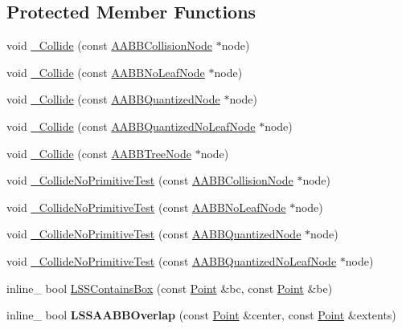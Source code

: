 \subsection*{Protected Member Functions}
\begin{DoxyCompactItemize}
\item 
void \hyperlink{classOpcode_1_1LSSCollider_a74b9eb6e39c8b4859acf2d3ca081c0d4}{\+\_\+\+Collide} (const \hyperlink{classOpcode_1_1AABBCollisionNode}{A\+A\+B\+B\+Collision\+Node} $\ast$node)
\item 
void \hyperlink{classOpcode_1_1LSSCollider_a9792bff52aa3bf2649985effc4d9ad70}{\+\_\+\+Collide} (const \hyperlink{classOpcode_1_1AABBNoLeafNode}{A\+A\+B\+B\+No\+Leaf\+Node} $\ast$node)
\item 
void \hyperlink{classOpcode_1_1LSSCollider_ad825f62a1d2526c2e99a2af5914fa0a8}{\+\_\+\+Collide} (const \hyperlink{classOpcode_1_1AABBQuantizedNode}{A\+A\+B\+B\+Quantized\+Node} $\ast$node)
\item 
void \hyperlink{classOpcode_1_1LSSCollider_abf5c28e72380d3c823f3dbbb235bd14d}{\+\_\+\+Collide} (const \hyperlink{classOpcode_1_1AABBQuantizedNoLeafNode}{A\+A\+B\+B\+Quantized\+No\+Leaf\+Node} $\ast$node)
\item 
void \hyperlink{classOpcode_1_1LSSCollider_a9f2c81b73391ff1cc32c0ee4c4bc7aca}{\+\_\+\+Collide} (const \hyperlink{classOpcode_1_1AABBTreeNode}{A\+A\+B\+B\+Tree\+Node} $\ast$node)
\item 
void \hyperlink{classOpcode_1_1LSSCollider_a1bf5401f4728c864a6b147d72b29dcc7}{\+\_\+\+Collide\+No\+Primitive\+Test} (const \hyperlink{classOpcode_1_1AABBCollisionNode}{A\+A\+B\+B\+Collision\+Node} $\ast$node)
\item 
void \hyperlink{classOpcode_1_1LSSCollider_ab262f0ff938684510baddd1974867e90}{\+\_\+\+Collide\+No\+Primitive\+Test} (const \hyperlink{classOpcode_1_1AABBNoLeafNode}{A\+A\+B\+B\+No\+Leaf\+Node} $\ast$node)
\item 
void \hyperlink{classOpcode_1_1LSSCollider_a8bb347360fc20fe78652713c039da096}{\+\_\+\+Collide\+No\+Primitive\+Test} (const \hyperlink{classOpcode_1_1AABBQuantizedNode}{A\+A\+B\+B\+Quantized\+Node} $\ast$node)
\item 
void \hyperlink{classOpcode_1_1LSSCollider_a056188eaa9ebd253545261b848c85178}{\+\_\+\+Collide\+No\+Primitive\+Test} (const \hyperlink{classOpcode_1_1AABBQuantizedNoLeafNode}{A\+A\+B\+B\+Quantized\+No\+Leaf\+Node} $\ast$node)
\item 
inline\+\_\+ bool \hyperlink{classOpcode_1_1LSSCollider_aa94af15eb2e56b0ab8c9bfdcfb3f8a8f}{L\+S\+S\+Contains\+Box} (const \hyperlink{classOpcode_1_1Point}{Point} \&bc, const \hyperlink{classOpcode_1_1Point}{Point} \&be)
\item 
inline\+\_\+ bool {\bfseries L\+S\+S\+A\+A\+B\+B\+Overlap} (const \hyperlink{classOpcode_1_1Point}{Point} \&center, const \hyperlink{classOpcode_1_1Point}{Point} \&extents)\hypertarget{classOpcode_1_1LSSCollider_a6b241d8f90a8d62be0e4dfaeaaf3663e}{}\label{classOpcode_1_1LSSCollider_a6b241d8f90a8d62be0e4dfaeaaf3663e}


\end{DoxyCompactItemize}
